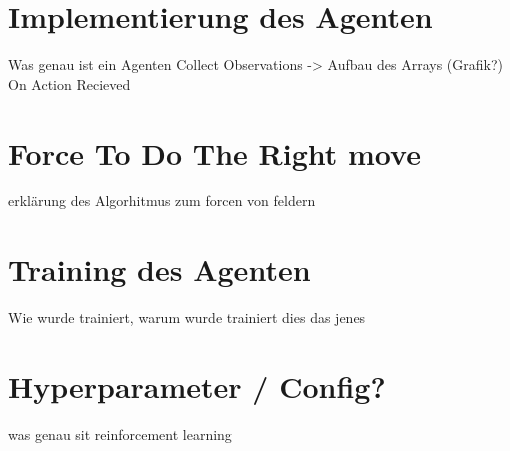 \section{Implementierung des Agenten}
Was genau ist ein Agenten
Collect Observations -> Aufbau des Arrays (Grafik?)
On Action Recieved

\section{Force To Do The Right move}
erklärung des Algorhitmus zum forcen von feldern


\section{Training des Agenten}
Wie wurde trainiert, warum wurde trainiert dies das jenes

\section{Hyperparameter / Config?}
was genau sit reinforcement learning
